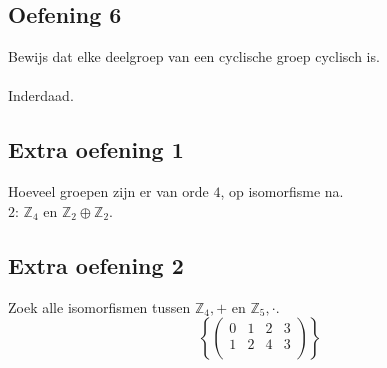\documentclass[main.tex]{subfiles}
\begin{document}
\subsection*{Oefening 6}
Bewijs dat elke deelgroep van een cyclische groep cyclisch is.\\\\
Inderdaad.

\subsection*{Extra oefening 1}
Hoeveel groepen zijn er van orde $4$, op isomorfisme na.\\
$2$: $\mathbb{Z}_{4}$ en $\mathbb{Z}_{2} \oplus \mathbb{Z}_{2}$.

\subsection*{Extra oefening 2}
Zoek alle isomorfismen tussen $\mathbb{Z}_{4},+$ en $\mathbb{Z}_{5},\cdot$.
\[
\left\{
  \begin{pmatrix}
    0 & 1 & 2 & 3\\
    1 & 2 & 4 & 3\\
  \end{pmatrix}
\right\}
\]
\end{document}
